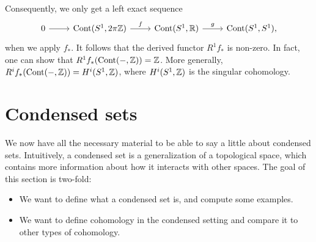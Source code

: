 \documentclass{article}
\DeclareMathOperator{\Cont}{Cont}
\begin{document}
\begin{example}
    Consequently, we only get a left exact sequence
    \begin{equation*}
        \begin{tikzcd}
            0 \rar & \Cont(S^1, 2\pi \bbZ) \rar["f"] & \Cont(S^1, \bbR)
            \rar["g"] & \Cont(S^1, S^1),
        \end{tikzcd}
    \end{equation*}
    when we apply $f_*$. It follows that the derived functor $R^1f_*$ is
    non-zero. In fact, one can show that $R^1f_*(\Cont(-, \bbZ)) = \bbZ$.
    More generally, $R^if_*(\Cont(-, \bbZ)) = H^i(S^1 , \bbZ)$, where
    $H^i(S^1, \mathbb{Z})$ is the singular cohomology.
\end{example}
\section{Condensed sets}

We now have all the necessary material to be able to say a little
about condensed sets. Intuitively, a condensed set
is a generalization of a topological space, which contains
more information about how it interacts with other spaces.
The goal of this section is two-fold:
\begin{itemize}
    \item We want to define what a condensed set is,
          and compute some examples.
    \item We want to define cohomology in the condensed
          setting and compare it to other types of cohomology.
\end{itemize}
\end{document}

